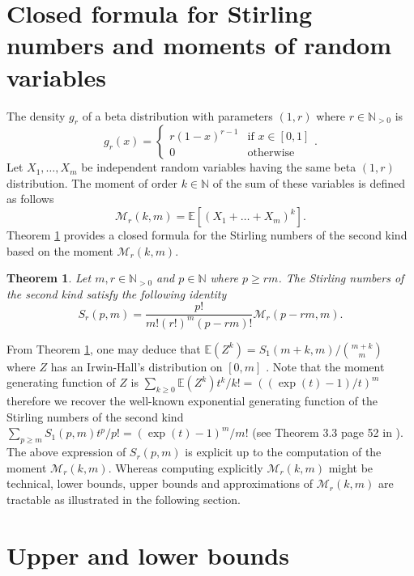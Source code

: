 \documentclass{article}
\theoremstyle{plain}
\newtheorem{theorem}{Theorem}[section]
\newcommand{\N}{{\mathbb N}}
\newcommand{\E}{{\mathbb E}}
\newcommand{\V}{{\mathcal M}}
\begin{document}
\section{Closed formula for Stirling numbers and moments of random variables}
The density $g_r$ of a beta  distribution with parameters $(1,r)$ where $r\in \N_{>0}$ is 
\begin{equation} \label{beta}
g_r(x) = \begin{cases}
r(1-x)^{r-1} &\text{if }x\in[0,1]\\
0 &\text{otherwise}
\end{cases}.
\end{equation}
Let $X_1,\dots, X_m$ be independent random variables having the same beta $(1,r)$ distribution. The moment of order $k\in\N$ of the sum of these variables is defined as follows
\begin{equation}
\label{eq:mom0}
\V_r(k,m)=\E\left[\left(X_1+\dots+X_m\right)^k\right].
\end{equation}
Theorem \ref{thm:identity} provides a closed formula for the Stirling numbers of the second kind based on the moment $\V_r(k,m)$. 
\begin{theorem}
\label{thm:identity} Let $m,r\in \N_{>0}$ and $p\in \N$ where $p\ge rm$. The Stirling numbers of the second kind satisfy the following identity
\begin{equation}
S_r(p,m)=\frac{p!}{m!(r!)^m(p-rm)!}
\V_r(p-rm,m).
\end{equation}
\end{theorem}
From Theorem \ref{thm:identity}, one may deduce that $\E(Z^k)=S_1(m+k,m)/\binom{m+k}{m}$ where $Z$ has an Irwin-Hall's distribution on $[0,m]$ \cite{irwin1927frequency,hall1927distribution}. Note that the moment generating function of $Z$ is $\sum_{k\ge 0}\E(Z^k)t^k/k!=((\exp(t)-1)/t)^m$ therefore we recover the well-known exponential generating function of the Stirling numbers of the second kind $\sum_{p\ge m}S_1(p,m)t^p/p!=(\exp(t)-1)^m/m!$ 
(see Theorem 3.3 page 52 in \cite{mansour2015commutation}).
 The above expression of $S_r(p,m)$ is explicit up to the computation of the moment $\V_r(k,m)$. 
Whereas computing explicitly $\V_r(k,m)$ might be technical,
 lower bounds, upper bounds and approximations of $\V_r(k,m)$ are tractable as illustrated in the following section.


\section{Upper and lower bounds}
\end{document}
